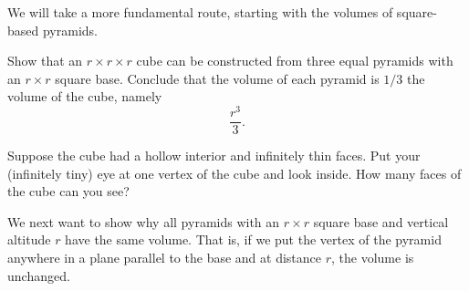 \documentclass[hints,handout,noauthor,nooutcomes,12pt,newpage]{ximera}
\begin{document}
We will take a more fundamental route, starting with the volumes of square-based
pyramids.

\begin{problem}
  Show that an $r\times r\times r$ cube can be constructed from three
  equal pyramids with an $r\times r$ square base. Conclude that the
  volume of each pyramid is $1/3$ the volume of the cube, namely
  \[
  \frac{r^{3}}{3}.
  \]

\begin{hint}
  Suppose the cube had a hollow interior and infinitely thin
  faces. Put your (infinitely tiny) eye at one vertex of the cube and
  look inside. How many faces of the cube can you see?
\end{hint}

\begin{freeResponse}
\begin{image}
\end{image}
\end{freeResponse}
\end{problem}

We next want to show why all pyramids with an $r\times r$ square base
and vertical altitude $r$ have the same volume. That is, if we put the
vertex of the pyramid anywhere in a plane parallel to the base and at
distance $r$, the volume is unchanged.
\end{document}
